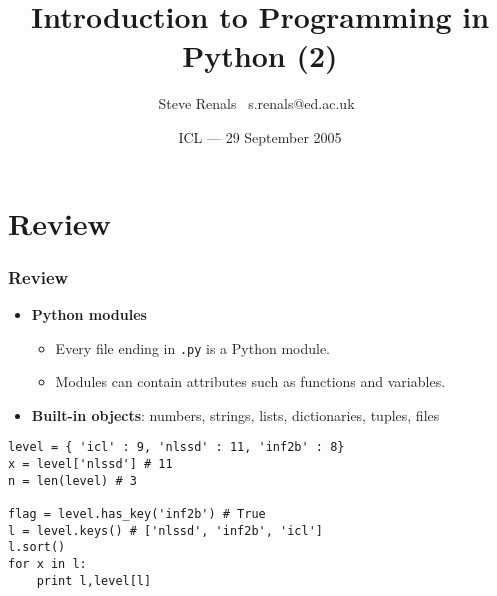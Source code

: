 \title{Introduction to Programming in Python (2)}
\author{Steve Renals \newline \mbox{ }s.renals@ed.ac.uk\mbox{ }}
\date{ICL --- 29 September 2005}



\frame{\titlepage}




\frame{\tableofcontents}

\section{Review}

\begin{frame}[fragile]
  \frametitle{Review}

  \begin{itemize}
  \item<1->  \textbf{Python modules}
    \begin{itemize}
    \item   Every file ending in \texttt{.py} is a Python module.
    \item Modules can contain attributes such as functions and variables.
    \end{itemize}
  \item<2-> \textbf{Built-in objects}: numbers, strings,  lists,
    dictionaries,  tuples,  files
  \end{itemize}

  \pause
  
{\small
\begin{verbatim}
level = { 'icl' : 9, 'nlssd' : 11, 'inf2b' : 8}
x = level['nlssd'] # 11
n = len(level) # 3

flag = level.has_key('inf2b') # True 
l = level.keys() # ['nlssd', 'inf2b', 'icl']
l.sort()
for x in l:
    print l,level[l]
\end{verbatim}
}
\end{frame}

